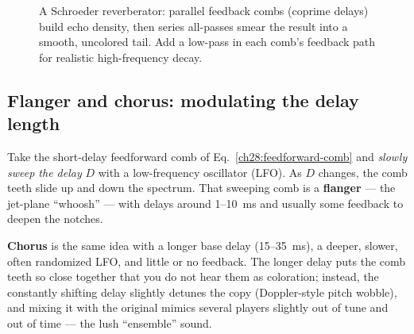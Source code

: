 \begin{figure}[H]
\centering
{}
\caption{A Schroeder reverberator: parallel feedback combs (coprime delays) build
echo density, then series all-passes smear the result into a smooth, uncolored
tail. Add a low-pass in each comb's feedback path for realistic high-frequency
decay.}
\label{ch28:fig-reverb}
\end{figure}

\subsection{Flanger and chorus: modulating the delay length}

Take the short-delay feedforward comb of Eq.~\eqref{ch28:feedforward-comb} and
\emph{slowly sweep the delay} $D$ with a low-frequency oscillator (LFO). As $D$
changes, the comb teeth slide up and down the spectrum. That sweeping comb is a
\textbf{flanger} --- the jet-plane ``whoosh'' --- with delays around 1--10~ms and
usually some feedback to deepen the notches.

\textbf{Chorus} is the same idea with a longer base delay (15--35~ms), a deeper,
slower, often randomized LFO, and little or no feedback. The longer delay puts
the comb teeth so close together that you do not hear them as coloration;
instead, the constantly shifting delay slightly detunes the copy (Doppler-style
pitch wobble), and mixing it with the original mimics several players slightly out
of tune and out of time --- the lush ``ensemble'' sound.

